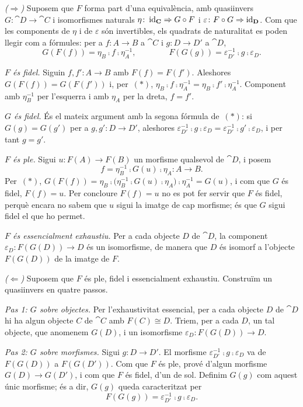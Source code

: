 \begin{prova}
\emph{($\Rightarrow$)} Suposem que $F$ forma part d'una equivalència, amb quasiinvers $G\colon\cat{D}\to\cat{C}$ i isomorfismes naturals $\eta\colon\operatorname{id}_{\mathbf{C}}\Rightarrow G\circ F$ i $\varepsilon\colon F\circ G\Rightarrow\operatorname{id}_{\mathbf{D}}$. Com que les components de $\eta$ i de $\varepsilon$ són invertibles, els quadrats de naturalitat es poden llegir com a fórmules: per a $f\colon A\to B$ a $\cat{C}$ i $g\colon D\to D'$ a $\cat{D}$,
\[
G(F(f))=\eta_B\comp f\comp\eta_A^{-1},
\qquad\qquad
F(G(g))=\varepsilon_{D'}^{-1}\comp g\comp\varepsilon_D.
\tag{$\ast$}
\]

\emph{$F$ és fidel.} Siguin $f,f'\colon A\to B$ amb $F(f)=F(f')$. Aleshores $G(F(f))=G(F(f'))$ i, per~$(\ast)$, $\eta_B\comp f\comp\eta_A^{-1}=\eta_B\comp f'\comp\eta_A^{-1}$. Component amb $\eta_B^{-1}$ per l'esquerra i amb $\eta_A$ per la dreta, $f=f'$.

\emph{$G$ és fidel.} És el mateix argument amb la segona fórmula de~$(\ast)$: si $G(g)=G(g')$ per a $g,g'\colon D\to D'$, aleshores $\varepsilon_{D'}^{-1}\comp g\comp\varepsilon_D=\varepsilon_{D'}^{-1}\comp g'\comp\varepsilon_D$, i per tant $g=g'$.

\emph{$F$ és ple.} Sigui $u\colon F(A)\to F(B)$ un morfisme qualsevol de $\cat{D}$, i posem
\[
f=\eta_B^{-1}\comp G(u)\comp\eta_A\colon A\to B.
\]
Per~$(\ast)$, $G(F(f))=\eta_B\comp\bigl(\eta_B^{-1}\comp G(u)\comp\eta_A\bigr)\comp\eta_A^{-1}=G(u)$, i com que $G$ és fidel, $F(f)=u$. Per concloure $F(f)=u$ no es pot fer servir que $F$ és fidel, perquè encara no sabem que $u$ sigui la imatge de cap morfisme; és que $G$ sigui fidel el que ho permet.

\emph{$F$ és essencialment exhaustiu.} Per a cada objecte $D$ de $\cat{D}$, la component $\varepsilon_D\colon F(G(D))\to D$ és un isomorfisme, de manera que $D$ és isomorf a l'objecte $F(G(D))$ de la imatge de $F$.

\emph{($\Leftarrow$)} Suposem que $F$ és ple, fidel i essencialment exhaustiu. Construïm un quasiinvers en quatre passos.

\emph{Pas 1: $G$ sobre objectes.} Per l'exhaustivitat essencial, per a cada objecte $D$ de $\cat{D}$ hi ha algun objecte $C$ de $\cat{C}$ amb $F(C)\cong D$. Triem, per a cada $D$, un tal objecte, que anomenem $G(D)$, i un isomorfisme $\varepsilon_D\colon F(G(D))\to D$.

\emph{Pas 2: $G$ sobre morfismes.} Sigui $g\colon D\to D'$. El morfisme $\varepsilon_{D'}^{-1}\comp g\comp\varepsilon_D$ va de $F(G(D))$ a $F(G(D'))$. Com que $F$ és ple, prové d'algun morfisme $G(D)\to G(D')$, i com que $F$ és fidel, d'un de sol. Definim $G(g)$ com aquest únic morfisme; és a dir, $G(g)$ queda caracteritzat per
\[
F(G(g))=\varepsilon_{D'}^{-1}\comp g\comp\varepsilon_D.
\tag{$\ast\ast$}
\]


\end{prova}
